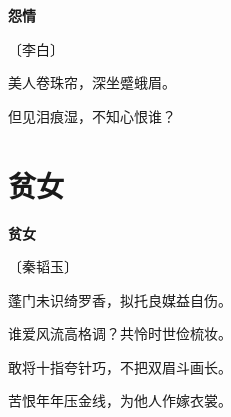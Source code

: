 \documentclass[12pt,UTF-8,openany,fontset=none]{ctexbook}
\begin{document}
\begin{center}
    {\bfseries 怨情}

    \vspace{18pt}

    \begin{large}\xuwen
        〔李白〕
    \end{large}

\end{center}

    \vspace{18pt}

\begin{center}
    \begin{Large}

        美人卷珠帘，深坐蹙蛾眉。

        但见泪痕湿，不知心恨谁？

    \end{Large}

\end{center}

\vspace{8pt}
\clearpage

\section{贫女}


\begin{center}
    {\bfseries 贫女}

    \vspace{18pt}

    \begin{large}\xuwen
        〔秦韬玉〕
    \end{large}

\end{center}

    \vspace{18pt}

\begin{center}
    \begin{Large}

        蓬门未识绮罗香，拟托良媒益自伤。

        谁爱风流高格调？共怜时世俭梳妆。

        敢将十指夸针巧，不把双眉斗画长。

        苦恨年年压金线，为他人作嫁衣裳。

    \end{Large}

\end{center}
\end{document}
